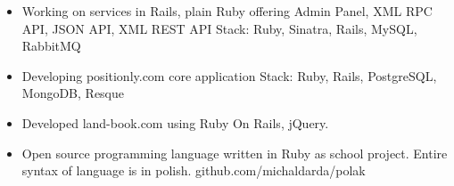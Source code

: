 \documentclass[10pt,a4paper,ragged2e]{altacv}
\begin{document}
\divider

\begin{itemize}
\item Working on services in Rails, plain Ruby offering Admin Panel,
XML RPC API, JSON API, XML REST API \newline
{\small Stack: Ruby, Sinatra, Rails, MySQL, RabbitMQ}
\end{itemize}

\divider

\begin{itemize}
\item Developing positionly.com core application \newline
{\small Stack: Ruby, Rails, PostgreSQL, MongoDB, Resque}
\end{itemize}


\begin{itemize}
\item Developed land-book.com using Ruby On Rails, jQuery.
\end{itemize}

\divider

\begin{itemize}
\item Open source programming language written in Ruby as
school project. Entire syntax of language is in polish. \newline
github.com/michaldarda/polak
\end{itemize}

\medskip

\clearpage

\nocite{*}

\end{document}

